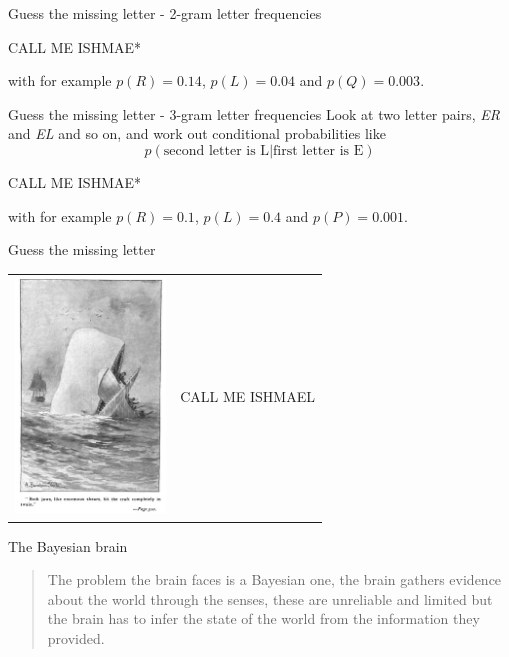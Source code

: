 \documentclass{beamer}
\newcommand{\crish}{\color{reddish}}
\newcommand{\cbla}{\color{black}}
\newcommand{\cred}{\color{red}}
\newcommand{\cblu}{\color{blue}}
\begin{document}
\begin{frame}{Guess the missing letter - 2-gram letter frequencies}
    \begin{center}
    \cred{}CALL ME ISHMA\cblu{}E*\cbla{}
  \end{center}
  with for example \crish$p(R)=0.14$\cbla{}, \crish$p(L)=0.04$\cbla{} and \crish$p(Q)=0.003$\cbla{}. 
  \end{frame}


\begin{frame}{Guess the missing letter - 3-gram letter frequencies}
  Look at two letter pairs, \textsl{ER} and \textsl{EL} and so on, and
  work out conditional probabilities like \crish$$ p(\mbox{second
    letter is L}|\mbox{first letter is E})
  $$\cbla{}
    \begin{center}
    \cred{}CALL ME ISHM\cblu{}AE*\cbla{}
  \end{center}
  with for example \crish$p(R)=0.1$\cbla{}, \crish$p(L)=0.4$\cbla{} and \crish$p(P)=0.001$\cbla{}. 
  \end{frame}


\begin{frame}{Guess the missing letter}
  \begin{tabular}{lc}
    \includegraphics[width=4cm]{Moby_Dick.jpg}&\cred{}CALL ME ISHMAEL\cbla{}
  \end{tabular}
  \end{frame}

\begin{frame}{The Bayesian brain}

  \begin{quote}
    The problem the brain faces is a Bayesian one, the brain
gathers evidence about the world through the senses, these are
unreliable and limited but the brain has to infer the state of the
world from the information they provided.
  \end{quote}
\end{frame}
\end{document}
